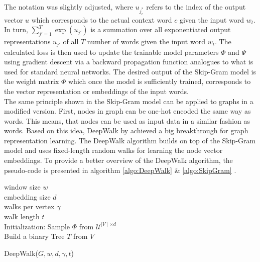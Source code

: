 	\noindent The notation was slightly adjusted, where $u_{j_{c}^{*}}$ refers
	to the index of the output vector $u$ which corresponds to the actual
	context word $c$ given the input word $w_{t}$. In turn, 
	$\sum_{j'=1}^{T}\exp(u_{j'})$ is a summation over all exponentiated output 
	representations $u_{j'}$ of all $T$ number of words given the input word 
	$w_{t}$. The calculated loss is then used to update the trainable model 
	parameters $\Phi$ and $\Psi$ using gradient descent via a backward 
	propagation function analogues to what is used for standard neural 
	networks. The desired output of the Skip-Gram model is the weight matrix
	$\Phi$ which once the model is sufficiently trained, corresponds to the
	vector representation or embeddings of the input words. \\

	\noindent The same principle shown in the Skip-Gram model can be applied
	to graphs in a modified version. First, nodes in graph can be one-hot
	encoded the same way as words. This means, that nodes can be used as input
	data in a similar fashion as words. Based on this idea, DeepWalk by
	\cite{perozzi2014deepwalk} achieved a big breakthrough for graph
	representation learning. The DeepWalk algorithm builds on top of the 
	Skip-Gram model and uses fixed-length random walks for learning the node 
	vector embeddings. To provide a better overview of the DeepWalk algorithm, 
	the pseudo-code is presented in algorithm \ref{algo:DeepWalk} \& 
	\ref{algo:SkipGram} \citep[p. 704]{perozzi2014deepwalk}.
	
	\begin{algorithm}
		\scriptsize
		\SetAlgoLined
		window size $w$\\
		embedding size $d$\\
		walks per vertex $\gamma$\\
		walk length $t$\\
		\nl Initialization: Sample $\Phi$ from $\mathcal{U}^{\mid V
		\mid \times d}$ \\
		\nl Build a binary Tree $T$ from $V$ \\
		\nl {}
		\caption{DeepWalk($G,w,d,\gamma,t$)}
		\label{algo:DeepWalk}
	\end{algorithm}
	
